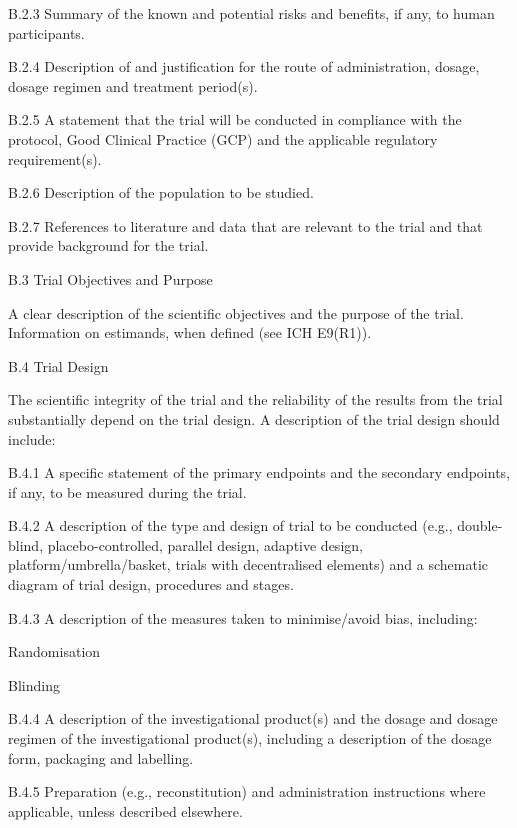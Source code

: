 \documentclass[11pt]{article}
\begin{document}
B.2.3 Summary of the known and potential risks and benefits, if any, to human participants.


B.2.4 Description of and justification for the route of administration, dosage, dosage regimen and treatment period(s).


B.2.5 A statement that the trial will be conducted in compliance with the protocol, Good Clinical Practice (GCP) and the applicable regulatory requirement(s).


B.2.6 Description of the population to be studied.


B.2.7 References to literature and data that are relevant to the trial and that provide background for the trial.


B.3 Trial Objectives and Purpose


A clear description of the scientific objectives and the purpose of the trial. Information on estimands, when defined (see ICH E9(R1)).


B.4 Trial Design


The scientific integrity of the trial and the reliability of the results from the trial substantially depend on the trial design. A description of the trial design should include:


B.4.1 A specific statement of the primary endpoints and the secondary endpoints, if any, to be measured during the trial.


B.4.2 A description of the type and design of trial to be conducted (e.g., double-blind, placebo-controlled, parallel design, adaptive design, platform/umbrella/basket, trials with decentralised elements) and a schematic diagram of trial design, procedures and stages.


B.4.3 A description of the measures taken to minimise/avoid bias, including:


\begin{description}[leftmargin=2.5cm,style=sameline]

\item[(a)] Randomisation

\item[(b)] Blinding

\end{description}

B.4.4 A description of the investigational product(s) and the dosage and dosage regimen of the investigational product(s), including a description of the dosage form, packaging and labelling.


B.4.5 Preparation (e.g., reconstitution) and administration instructions where applicable, unless described elsewhere.
\end{document}
